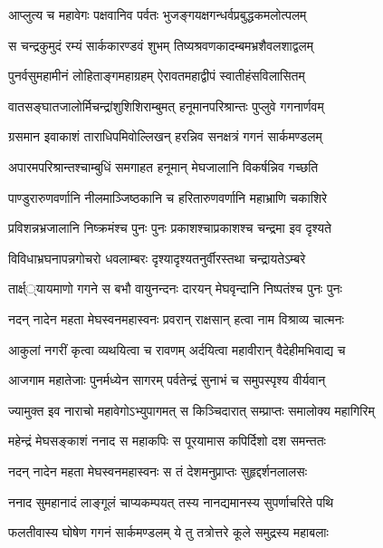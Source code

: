 
\twolineshloka
{आप्लुत्य च महावेगः पक्षवानिव पर्वतः}
{भुजङ्गयक्षगन्धर्वप्रबुद्धकमलोत्पलम्} %

\twolineshloka
{स चन्द्रकुमुदं रम्यं सार्ककारण्डवं शुभम्}
{तिष्यश्रवणकादम्बमभ्रशैवलशाद्वलम्} %

\twolineshloka
{पुनर्वसुमहामीनं लोहिताङ्गमहाग्रहम्}
{ऐरावतमहाद्वीपं स्वातीहंसविलासितम्} %

\twolineshloka
{वातसङ्घातजालोर्मिचन्द्रांशुशिशिराम्बुमत्}
{हनूमानपरिश्रान्तः पुप्लुवे गगनार्णवम्} %

\twolineshloka
{ग्रसमान इवाकाशं ताराधिपमिवोल्लिखन्}
{हरन्निव सनक्षत्रं गगनं सार्कमण्डलम्} %

\twolineshloka
{अपारमपरिश्रान्तश्चाम्बुधिं समगाहत}
{हनूमान् मेघजालानि विकर्षन्निव गच्छति} %

\twolineshloka
{पाण्डुरारुणवर्णानि नीलमाञ्जिष्ठकानि च}
{हरितारुणवर्णानि महाभ्राणि चकाशिरे} %

\twolineshloka
{प्रविशन्नभ्रजालानि निष्क्रमंश्च पुनः पुनः}
{प्रकाशश्चाप्रकाशश्च चन्द्रमा इव दृश्यते} %

\twolineshloka
{विविधाभ्रघनापन्नगोचरो धवलाम्बरः}
{दृश्यादृश्यतनुर्वीरस्तथा चन्द्रायतेऽम्बरे} %

\twolineshloka
{तार्क्ष््यायमाणो गगने स बभौ वायुनन्दनः}
{दारयन् मेघवृन्दानि निष्पतंश्च पुनः पुनः} %

\twolineshloka
{नदन् नादेन महता मेघस्वनमहास्वनः}
{प्रवरान् राक्षसान् हत्वा नाम विश्राव्य चात्मनः} %

\twolineshloka
{आकुलां नगरीं कृत्वा व्यथयित्वा च रावणम्}
{अर्दयित्वा महावीरान् वैदेहीमभिवाद्य च} %

\twolineshloka
{आजगाम महातेजाः पुनर्मध्येन सागरम्}
{पर्वतेन्द्रं सुनाभं च समुपस्पृश्य वीर्यवान्} %

\twolineshloka
{ज्यामुक्त इव नाराचो महावेगोऽभ्युपागमत्}
{स किञ्चिदारात् सम्प्राप्तः समालोक्य महागिरिम्} %

\twolineshloka
{महेन्द्रं मेघसङ्काशं ननाद स महाकपिः}
{स पूरयामास कपिर्दिशो दश समन्ततः} %

\twolineshloka
{नदन् नादेन महता मेघस्वनमहास्वनः}
{स तं देशमनुप्राप्तः सुहृद्दर्शनलालसः} %

\twolineshloka
{ननाद सुमहानादं लाङ्गूलं चाप्यकम्पयत्}
{तस्य नानद्यमानस्य सुपर्णाचरिते पथि} %

\twolineshloka
{फलतीवास्य घोषेण गगनं सार्कमण्डलम्}
{ये तु तत्रोत्तरे कूले समुद्रस्य महाबलाः} %

